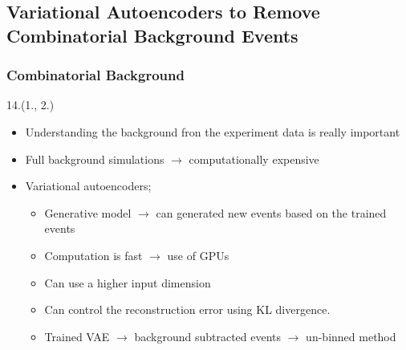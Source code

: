 \documentclass[12pt, xcolor={dvipsnames}, aspectratio = 169, sans,mathserif]{beamer}
\newenvironment{List}[2]
{\begin{textblock}{#1}#2
\begin{itemize}}
{\end{itemize}
\end{textblock}}
\begin{document}
\subsection{Variational Autoencoders to Remove Combinatorial Background Events}

\begin{frame}
\frametitle{Combinatorial Background}

\begin{List}{14.}{(1., 2.)}

  \item Understanding the background fron the experiment data is really important

  \item Full background simulations $\rightarrow$ computationally expensive

  \item Variational autoencoders;

  \begin{itemize}

    \item Generative model $\rightarrow$ can generated new events based on the trained events

    \item Computation is fast $\rightarrow$ use of GPUs

    \item Can use a higher input dimension

    \item Can control the reconstruction error using KL divergence.

    \item Trained VAE $\rightarrow$ background subtracted events $\rightarrow$ un-binned method

  \end{itemize}

\end{List}

\end{frame}
\end{document}
